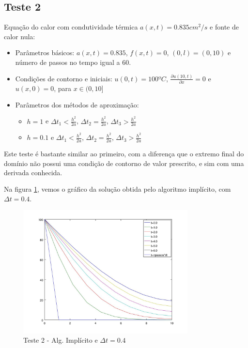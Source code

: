 \documentclass[
	11pt,				%
	oneside,			%
	a4paper,			%
	english,			%
	brazil,				%
	]{article}
\begin{document}
\subsection{Teste 2}
Equação do calor com condutividade térmica $a(x,t) = 0.835 cm^2/s$ e fonte de 
calor nula:

\begin{itemize}
 \item Parâmetros básicos:
 $a(x,t) = 0.835$, $f(x,t) = 0$, $(0,l) = (0,10)$ e número de passos no tempo 
igual a 60.
 \item Condições de contorno e iniciais:
 $u(0,t) = 100ºC$, $\frac{\partial u(10,t)}{\partial x} = 0$ e 
$u(x,0) = 0$, para $x \in (0,10]$
 \item Parâmetros dos métodos de aproximação:
 \begin{itemize}
  \item $h = 1$ e $\Delta t_1 < \frac{h^2}{2a}$, $\Delta t_2 = 
\frac{h^2}{2a}$, $\Delta t_3 > \frac{h^2}{2a}$
  \item $h = 0.1$ e $\Delta t_1 < \frac{h^2}{2a}$, $\Delta t_2 = 
\frac{h^2}{2a}$, $\Delta t_3 > \frac{h^2}{2a}$
 \end{itemize}
\end{itemize}

Este teste é bastante similar ao primeiro, com a diferença que o extremo final 
do domínio não possui uma condição de contorno de valor prescrito, e sim com 
uma derivada conhecida.

Na figura \ref{fig:t2-imp}, vemos o gráfico da solução obtida pelo 
algoritmo implícito, com $\Delta t = 0.4$.

\begin{figure}[ht]
    \centering
    \includegraphics[width=0.8\textwidth]{teste2-imp-dt-04}
    \caption{Teste 2 - Alg. Implícito e $\Delta t = 0.4$}
    \label{fig:t2-imp}
\end{figure}
\end{document}
